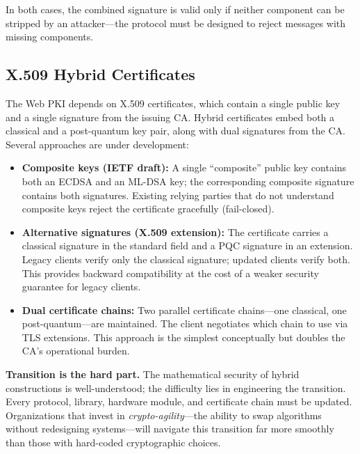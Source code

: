 \noindent In both cases, the combined signature is valid only if neither component can be stripped by an attacker---the protocol must be designed to reject messages with missing components.

\subsection{X.509 Hybrid Certificates}
\label{subsec:hybrid-certs}

The Web PKI depends on X.509 certificates, which contain a single public key and a single signature from the issuing CA.  Hybrid certificates embed both a classical and a post-quantum key pair, along with dual signatures from the CA.  Several approaches are under development:

\begin{itemize}
\item \textbf{Composite keys (IETF draft):}  A single ``composite'' public key contains both an ECDSA and an ML-DSA key; the corresponding composite signature contains both signatures.  Existing relying parties that do not understand composite keys reject the certificate gracefully (fail-closed).

\item \textbf{Alternative signatures (X.509 extension):}  The certificate carries a classical signature in the standard field and a PQC signature in an extension.  Legacy clients verify only the classical signature; updated clients verify both.  This provides backward compatibility at the cost of a weaker security guarantee for legacy clients.

\item \textbf{Dual certificate chains:}  Two parallel certificate chains---one classical, one post-quantum---are maintained.  The client negotiates which chain to use via TLS extensions.  This approach is the simplest conceptually but doubles the CA's operational burden.
\end{itemize}

\begin{svgraybox}
\textbf{Transition is the hard part.}
The mathematical security of hybrid constructions is well-understood; the difficulty lies in engineering the transition.  Every protocol, library, hardware module, and certificate chain must be updated.  Organizations that invest in \emph{crypto-agility}---the ability to swap algorithms without redesigning systems---will navigate this transition far more smoothly than those with hard-coded cryptographic choices.
\end{svgraybox}


